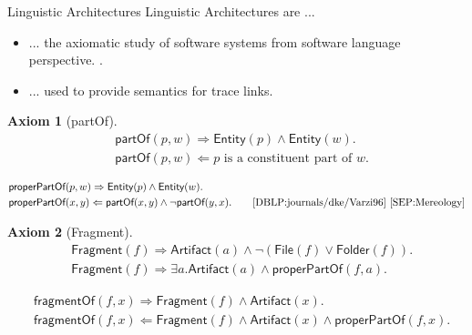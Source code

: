 \documentclass{beamer}
\newtheorem{axiom}{Axiom}
\newcommand{\Entity}{\textsf{Entity}}
\newcommand{\Artifact}{\textsf{Artifact}}
\newcommand{\File}{\textsf{File}}
\newcommand{\Folder}{\textsf{Folder}}
\newcommand{\Fragment}{\textsf{Fragment}}
\newcommand{\partOf}{\textsf{partOf}}
\newcommand{\properPartOf}{\textsf{properPartOf}}
\newcommand{\fragmentOf}{\textsf{fragmentOf}}
\begin{document}
\begin{frame}{Linguistic Architectures}
Linguistic Architectures are ...
\begin{itemize}
\item
... the axiomatic study of software systems from software language perspective.
\cite{DBLP:conf/modelsward/HeinzLV17}
\cite{DBLP:conf/sle/Lammel16}
\cite{DBLP:conf/ecmdafa/LammelV14}
\cite{DBLP:conf/models/FavreLV12}.

\item
... used to provide semantics for trace links.
\end{itemize}
\pagebreak
\begin{axiom}[partOf]
\begin{align*}
&\partOf(p,w)
\Rightarrow
\Entity(p) \wedge \Entity(w).\\
&\partOf(p,w)
\Leftarrow
p \text{ is a constituent part of } w.
\end{align*}
\end{axiom}

\begin{definition}[porperPartOf]
\begin{align*}
&\properPartOf(p,w)
\Rightarrow
\Entity(p) \wedge \Entity(w).\\
&\properPartOf(x,y)
\Leftarrow
\partOf(x,y) \wedge \neg \partOf(y,x).
\qquad\text{\cite{DBLP:journals/dke/Varzi96} \cite{SEP:Mereology}}
\end{align*}
\end{definition}
\pagebreak
\begin{axiom}[Fragment]
\begin{align*}
&\Fragment(f) 
\Rightarrow
\Artifact(a) \wedge \neg(\File(f) \vee \Folder(f)).\\
&\Fragment(f) 
\Rightarrow 
\exists a.\Artifact(a) \wedge \properPartOf(f,a).
\end{align*}
\end{axiom}

\begin{definition}[fragmentOf]
\begin{align*}
&\fragmentOf(f,x) 
\Rightarrow
\Fragment(f) \wedge \Artifact(x).\\
&\fragmentOf(f,x) 
\Leftarrow
\Fragment(f) \wedge \Artifact(x) \wedge \properPartOf(f,x).
\end{align*}
\end{definition}


\end{frame}
\end{document}
